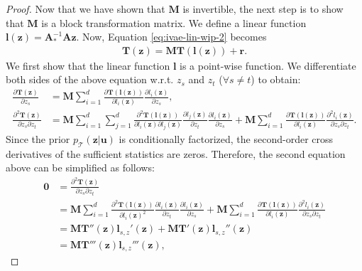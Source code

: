 \documentclass[10pt]{article} %
\theoremstyle{plain}
\theoremstyle{definition}
\begin{document}
\begin{proof}
    Now that we have shown that $\mathbf{M}$ is invertible, the next step is to show that $\mathbf{M}$ is a block transformation matrix. We define a linear function $\mathbf{l}(\mathbf{z})=\mathbf{A}_{*}^{-1}\mathbf{A}\mathbf{z}$. Now, Equation \eqref{eq:ivae-lin-wip-2} becomes
    \begin{align}
        \mathbf{T}(\mathbf{z})=\mathbf{M}\mathbf{T}(\mathbf{l}(\mathbf{z})) +\mathbf{r}.\label{eq:identifiability}
    \end{align}
    We first show that the linear function $\mathbf{l}$ is a point-wise function. We differentiate both sides of the above equation w.r.t. $z_s$ and $z_t$ ($\forall s\not=t$) to obtain:
    \begin{align}
        \frac{\partial\mathbf{T}(\mathbf{z})}{\partial z_s} &= \mathbf{M}\sum_{i=1}^d\frac{\partial \mathbf{T}(\mathbf{l}(\mathbf{z}))}{\partial l_i(\mathbf{z})}\frac{\partial l_i(\mathbf{z})}{\partial z_s},\\
        \frac{\partial^2\mathbf{T}(\mathbf{z})}{\partial z_s\partial z_t} &= \mathbf{M}\sum_{i=1}^d \sum_{j=1}^d \frac{\partial^2 \mathbf{T}(\mathbf{l}(\mathbf{z}))}{\partial l_i(\mathbf{z}) \partial l_j(\mathbf{z})}\frac{\partial l_j(\mathbf{z})}{\partial z_t} \frac{\partial l_i(\mathbf{z})}{\partial z_s}  + \mathbf{M}\sum_{i=1}^d\frac{\partial \mathbf{T}(\mathbf{l}(\mathbf{z}))}{\partial l_i(\mathbf{z})}\frac{\partial^2 l_i(\mathbf{z})}{\partial z_s \partial z_t}.
    \end{align}
    Since the prior $p_{\mathcal{T}}(\mathbf{z}|\mathbf{u})$ is conditionally factorized, the second-order cross derivatives of the sufficient statistics are zeros. Therefore, the second equation above can be simplified as follows:
    \begin{align}
        \mathbf{0} &= \frac{\partial^2\mathbf{T}(\mathbf{z})}{\partial z_s\partial z_t}\\
        &= \mathbf{M}\sum_{i=1}^d \frac{\partial^2 \mathbf{T}(\mathbf{l}(\mathbf{z}))}{\partial l_i(\mathbf{z})^2}\frac{\partial l_i(\mathbf{z})}{\partial z_t} \frac{\partial l_i(\mathbf{z})}{\partial z_s}  + \mathbf{M}\sum_{i=1}^d\frac{\partial \mathbf{T}(\mathbf{l}(\mathbf{z}))}{\partial l_i(\mathbf{z})}\frac{\partial^2 l_i(\mathbf{z})}{\partial z_s \partial z_t}\\
        &= \mathbf{M}\mathbf{T}''(\mathbf{z})\mathbf{l}_{s,z}'(\mathbf{z})+\mathbf{M}\mathbf{T}'(\mathbf{z})\mathbf{l}_{s,z}''(\mathbf{z})\\
        &=\mathbf{M}\mathbf{T}'''(\mathbf{z})\mathbf{l}_{s,z}'''(\mathbf{z}),

\end{align}
\end{proof}
\end{document}
